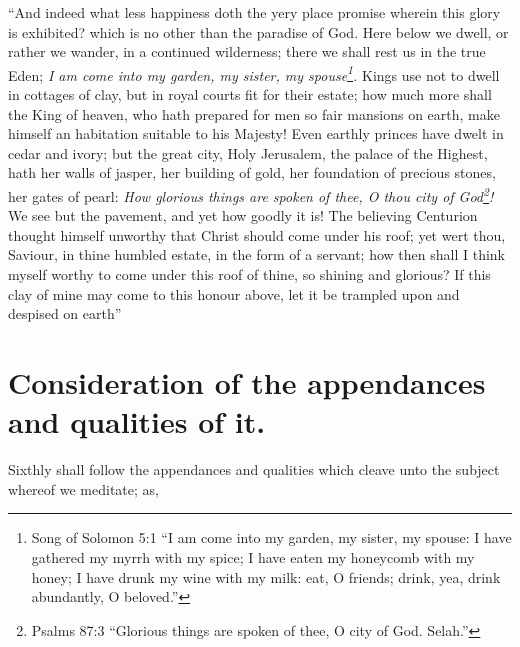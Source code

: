 ``And indeed what less happiness doth the yery place promise wherein this glory is exhibited? which is no other than the paradise of God. Here below we dwell, or rather we wander, in a continued wilderness; there we shall rest us in the true Eden; \emph{I am come into my garden, my sister, my spouse\footnote{Song of Solomon 5:1 ``I am come into my garden, my sister, my spouse: I have gathered my myrrh with my spice; I have eaten my honeycomb with my honey; I have drunk my wine with my milk: eat, O friends; drink, yea, drink abundantly, O beloved.''}.} Kings use not to dwell in cottages of clay, but in royal courts fit for their estate; how much more shall the King of heaven, who hath prepared for men so fair mansions on earth, make himself an habitation suitable to his Majesty! Even earthly princes have dwelt in cedar and ivory; but the great city, Holy Jerusalem, the palace of the Highest, hath her walls of jasper, her building of gold, her foundation of precious stones, her gates of pearl: \emph{How glorious things are spoken of thee, O thou city of God\footnote{Psalms 87:3 ``Glorious things are spoken of thee, O city of God. Selah.''}!} We see but the pavement, and yet how goodly it is! The believing Centurion thought himself unworthy that Christ should come under his roof; yet wert thou, Saviour, in thine humbled estate, in the form of a servant; how then shall I think myself worthy to come under this roof of thine, so shining and glorious? If this clay of mine may come to this honour above, let it be trampled upon and despised on earth''

\section{Consideration of the appendances and qualities of it.}

Sixthly shall follow the appendances and qualities which cleave unto the subject whereof we meditate; as, 

